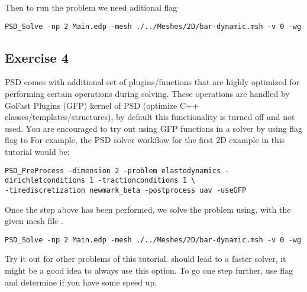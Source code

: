 Then to run the problem we need aditional  flag

\begin{lstlisting}[style=BashInputStyle]
PSD_Solve -np 2 Main.edp -mesh ./../Meshes/2D/bar-dynamic.msh -v 0 -wg
\end{lstlisting}

\subsection{Exercise  4}

PSD comes with additional set of plugins/functions that are highly
optimized for performing certain operations during solving. These
operations are handled by GoFast Plugins (GFP) kernel of PSD (optimize
C++ classes/templates/structures), by default this functionality is
turned off and not used. You are encouraged to try out using GFP
functions in a solver by using  flag flag to
 For example, the PSD solver workflow for the first
2D example in this tutorial would be:

\begin{lstlisting}[style=BashInputStyle]
PSD_PreProcess -dimension 2 -problem elastodynamics -dirichletconditions 1 -tractionconditions 1 \
-timediscretization newmark_beta -postprocess uav -useGFP
\end{lstlisting}

Once the step above has been performed, we solve the problem using, with
the given mesh file \psd{bar-dynamic}.

\begin{lstlisting}[style=BashInputStyle]
PSD_Solve -np 2 Main.edp -mesh ./../Meshes/2D/bar-dynamic.msh -v 0 -wg
\end{lstlisting}

Try it out for other problems of this tutorial.  should
lead to a faster solver, it might be a good idea to always use this
option. To go one step further, use \psd{-timelog} flag and determine if
you have some speed up.
